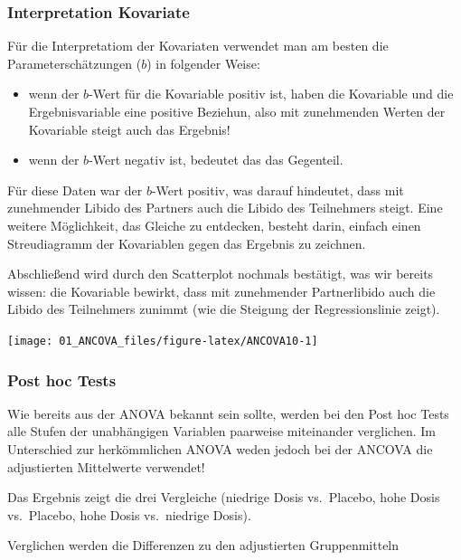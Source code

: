 \documentclass[]{article}
\providecommand{\tightlist}{%
  \setlength{\itemsep}{0pt}\setlength{\parskip}{0pt}}
\begin{document}
\subsubsection*{Interpretation
Kovariate}\label{interpretation-kovariate}

Für die Interpretatiom der Kovariaten verwendet man am besten die
Parameterschätzungen (\(b\)) in folgender Weise:

\begin{itemize}
\tightlist
\item
  wenn der \(b\)-Wert für die Kovariable positiv ist, haben die
  Kovariable und die Ergebnisvariable eine positive Beziehun, also mit
  zunehmenden Werten der Kovariable steigt auch das Ergebnis!
\item
  wenn der \(b\)-Wert negativ ist, bedeutet das das Gegenteil.
\end{itemize}

Für diese Daten war der \(b\)-Wert positiv, was darauf hindeutet, dass
mit zunehmender Libido des Partners auch die Libido des Teilnehmers
steigt. Eine weitere Möglichkeit, das Gleiche zu entdecken, besteht
darin, einfach einen Streudiagramm der Kovariablen gegen das Ergebnis zu
zeichnen.

Abschließend wird durch den Scatterplot nochmals bestätigt, was wir
bereits wissen: die Kovariable bewirkt, dass mit zunehmender
Partnerlibido auch die Libido des Teilnehmers zunimmt (wie die Steigung
der Regressionslinie zeigt).

\begin{center}\texttt{[image: 01\_ANCOVA\_files/figure-latex/ANCOVA10-1]} \end{center}

\subsubsection*{Post hoc Tests}\label{post-hoc-tests}

Wie bereits aus der ANOVA bekannt sein sollte, werden bei den Post hoc
Tests alle Stufen der unabhängigen Variablen paarweise miteinander
verglichen. Im Unterschied zur herkömmlichen ANOVA weden jedoch bei der
ANCOVA die adjustierten Mittelwerte verwendet!

Das Ergebnis zeigt die drei Vergleiche (niedrige Dosis vs.~Placebo, hohe
Dosis vs.~Placebo, hohe Dosis vs.~niedrige Dosis).

Verglichen werden die Differenzen zu den adjustierten Gruppenmitteln
\end{document}
